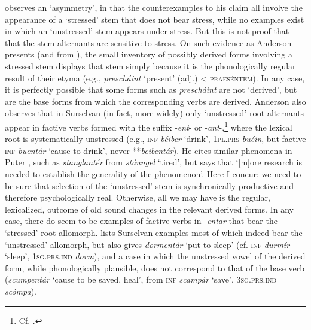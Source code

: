 \documentclass[output=paper,
modfonts
]{LSP/langsci}
\begin{document}
\citet[15]{anderson2013stem} observes an `asymmetry', in that the counterexamples
to his claim all involve the appearance of a `stressed' stem that does
not bear stress, while no examples exist in which an `unstressed' stem
appears under stress. But this is not proof that that the stem
alternants are sensitive to stress. On such evidence as Anderson
presents (and from \citealt{signorell2001a}), the small inventory of possibly
derived forms involving a stressed stem displays that stem simply
because it is the phonologically regular result of their etyma (e.g.,
\emph{prescháint} `present' (adj.) \textless{} \textsc{praeséntem}). In
any case, it is perfectly possible that some forms such as
\emph{prescháint} are not `derived', but are the base forms from which
the corresponding verbs are derived. Anderson also observes \citeyear[18]{anderson2013stem}
that in Surselvan (in fact, more widely) only `unstressed' root
alternants appear in factive verbs formed with the suffix -\emph{ent}-
or -\emph{ant}-,\footnote{Cf. \citet[103f.]{signorell1987a}.} where the
lexical root is systematically unstressed (e.g., \textsc{inf}
\emph{béiber} `drink', \textsc{1pl.prs} \emph{buéin}, but factive
\textsc{inf} \emph{buentár} `cause to drink', never **\emph{beibentár}).
He cites similar phenomena in Puter \citep[10]{anderson2013stem}, such as
\emph{stanglantér} from \emph{stáungel} `tired', but says that
`{[}m{]}ore research is needed to establish the generality of the
phenomenon'. Here I concur: we need to be sure that selection of the
`unstressed' stem is synchronically productive and therefore
psychologically real. Otherwise, all we may have is the regular,
lexicalized, outcome of old sound changes in the relevant derived forms.
In any case, there do seem to be examples of factive verbs in
-\emph{entar} that bear the `stressed' root allomorph. \citet[291f.]{jaberg1939a} lists Surselvan examples most of which indeed bear the
`unstressed' allomorph, but also gives \emph{dormentár} `put to sleep'
(cf. \textsc{inf} \emph{durmír} `sleep', \textsc{1sg.prs.ind}
\emph{dorm}), and a case in which the unstressed vowel of the derived
form, while phonologically plausible, does not correspond to that of the
base verb (\emph{scumpentár} `cause to be saved, heal', from
\textsc{inf} \emph{scampár} `save', \textsc{3sg.prs.ind} \emph{scómpa}).
\end{document}
